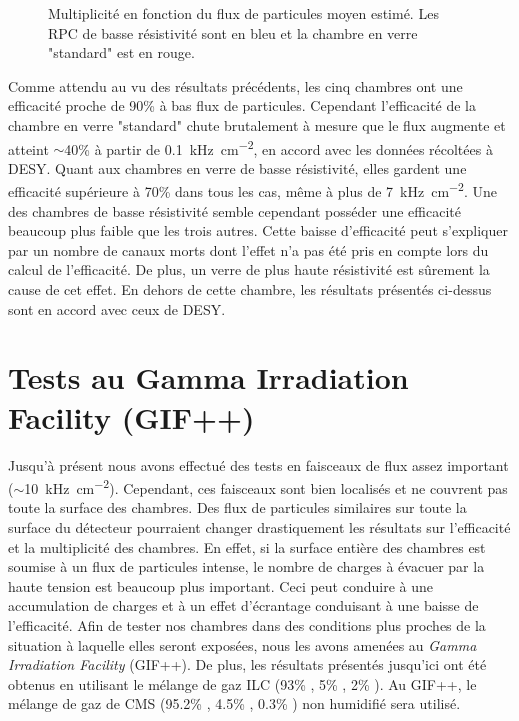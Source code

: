 \begin{figure}[!ht]
	\centering
	\caption{Multiplicité en fonction du flux de particules moyen estimé. Les RPC de basse résistivité sont en bleu et la chambre en verre "standard" est en rouge.}
	\label{MultiplictySPS}
\end{figure}
\vspace*{-0.2cm}
Comme attendu au vu des résultats précédents, les cinq chambres ont une efficacité proche de \num{90}\% à bas flux de particules. Cependant l'efficacité de  la chambre en verre "standard" chute brutalement à mesure que le flux augmente et atteint $\sim $40\% à partir de \SI{0.1}{\kilo\hertz\per\square\centi\meter}, en accord avec les données récoltées à DESY. Quant aux chambres en verre de basse résistivité, elles gardent une efficacité supérieure à 70\% dans tous les cas, même à plus de \SI{7}{\kilo\hertz\per\square\centi\meter}. Une des chambres de basse résistivité semble cependant posséder une efficacité beaucoup plus faible que les trois autres. Cette baisse d'efficacité peut s'expliquer par un nombre de canaux morts dont l'effet n'a pas été pris en compte lors du calcul de l'efficacité. De plus, un verre de plus haute résistivité est sûrement la cause de cet effet. En dehors de cette chambre, les résultats présentés ci-dessus sont en accord avec ceux de DESY.

\section{Tests au Gamma Irradiation Facility (GIF++)}
\vspace*{-0.2cm}
Jusqu'à présent nous avons effectué des tests en faisceaux de flux assez important ($\sim$\SI{10}{\kilo\hertz\per\square\centi\meter}). Cependant, ces faisceaux sont bien localisés et ne couvrent pas toute la surface des chambres. Des flux de particules similaires sur toute la surface du détecteur pourraient changer drastiquement les résultats sur l'efficacité et la multiplicité des chambres. En effet, si la surface entière des chambres est soumise à un flux de particules intense, le nombre de charges à évacuer par la haute tension est beaucoup plus important. Ceci peut conduire à une accumulation de charges et à un effet d'écrantage conduisant à une baisse de l'efficacité. Afin de tester nos chambres dans des conditions plus proches de la situation à laquelle elles seront exposées, nous les avons amenées au \textit{Gamma Irradiation Facility} (GIF++). De plus, les résultats présentés jusqu'ici ont été obtenus en utilisant le mélange de gaz ILC (\num{93}\% , \num{5}\% , \num{2}\% ). Au GIF++, le mélange de gaz de CMS (\num{95.2}\% , \num{4.5}\% , \num{0.3}\% ) non humidifié sera utilisé.

